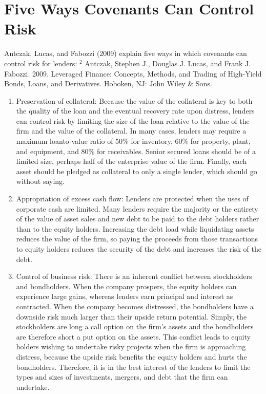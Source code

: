 \documentclass[11pt]{article}
\begin{document}
\section*{Five Ways Covenants Can Control Risk}
Antczak, Lucas, and Fabozzi (2009) explain five ways in which covenants can control risk for lenders: ${ }^{2}$ Antczak, Stephen J., Douglas J. Lucas, and Frank J. Fabozzi. 2009. Leveraged Finance: Concepts, Methods, and Trading of High-Yield Bonds, Loans, and Derivatives. Hoboken, NJ: John Wiley \& Sons.

\begin{enumerate}
  \item Preservation of collateral: Because the value of the collateral is key to both the quality of the loan and the eventual recovery rate upon distress, lenders can control risk by limiting the size of the loan relative to the value of the firm and the value of the collateral. In many cases, lenders may require a maximum loanto-value ratio of $50 \%$ for inventory, $60 \%$ for property, plant, and equipment, and $80 \%$ for receivables. Senior secured loans should be of a limited size, perhaps half of the enterprise value of the firm. Finally, each asset should be pledged as collateral to only a single lender, which should go without saying.

  \item Appropriation of excess cash flow: Lenders are protected when the uses of corporate cash are limited. Many lenders require the majority or the entirety of the value of asset sales and new debt to be paid to the debt holders rather than to the equity holders. Increasing the debt load while liquidating assets reduces the value of the firm, so paying the proceeds from those transactions to equity holders reduces the security of the debt and increases the risk of the debt.

  \item Control of business risk: There is an inherent conflict between stockholders and bondholders. When the company prospers, the equity holders can experience large gains, whereas lenders earn principal and interest as contracted. When the company becomes distressed, the bondholders have a downside risk much larger than their upside return potential. Simply, the stockholders are long a call option on the firm's assets and the bondholders are therefore short a put option on the assets. This conflict leads to equity holders wishing to undertake risky projects when the firm is approaching distress, because the upside risk benefits the equity holders and hurts the bondholders. Therefore, it is in the best interest of the lenders to limit the types and sizes of investments, mergers, and debt that the firm can undertake.


\end{enumerate}
\end{document}
